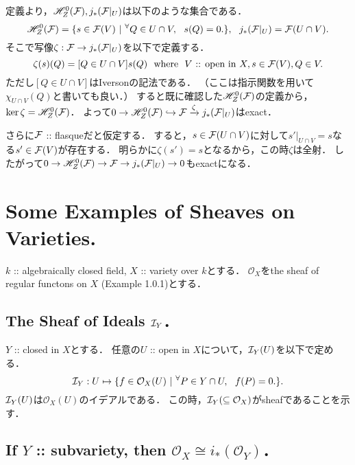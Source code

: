 \documentclass[a4paper]{jsarticle}
\begin{document}
    定義より，$\mathscr{H}_Z^0(\mathcal{F}), j_*(\mathcal{F}|_U)$は以下のような集合である．
    \[
        \mathscr{H}_Z^0(\mathcal{F})=\{ s \in \mathcal{F}(V) ~|~ {}^{\forall} Q \in U \cap V,~~ s(Q)=0. \},~~
        j_*(\mathcal{F}|_U)=\mathcal{F}(U \cap V).
    \]
    そこで写像$\zeta: \mathcal{F} \to j_*(\mathcal{F}|_U)$を以下で定義する．
    \[ \zeta(s)(Q)=[Q \in U \cap V]s(Q) ~~\text{where}~~ V \text{ :: open in } X, s \in \mathcal{F}(V), Q \in V. \]
    ただし$[Q \in U \cap V]$はIversonの記法である．
    （ここは指示関数を用いて$\chi_{U \cap V}(Q)$と書いても良い．）
    すると既に確認した$\mathscr{H}_Z^0(\mathcal{F})$の定義から，$\ker \zeta=\mathscr{H}_Z^0(\mathcal{F})$．
    よって$0 \to \mathscr{H}_Z^0(\mathcal{F}) \hookrightarrow \mathcal{F} \xrightarrow{\zeta} j_*(\mathcal{F}|_U)$はexact．
    
    さらに$\mathcal{F}$ :: flasqueだと仮定する．
    すると，$s \in \mathcal{F}(U \cap V)$に対して$s'|_{U \cap V}=s$なる$s' \in \mathcal{F}(V)$が存在する．
    明らかに$\zeta(s')=s$となるから，この時$\zeta$は全射．
    したがって$0 \to \mathscr{H}_Z^0(\mathcal{F}) \to \mathcal{F} \to j_*(\mathcal{F}|_U) \to 0$もexactになる．

\section{Some Examples of Sheaves on Varieties.} %
    $k$ :: algebraically closed field, $X$ :: variety over $k$とする．
    $\mathcal{O}_X$をthe sheaf of regular functons on $X$ (Example 1.0.1)とする．
    \subsection{The Sheaf of Ideals $\mathcal{I}_Y$．}
    $Y$ :: closed in $X$とする．
    任意の$U$ :: open in $X$について，$\mathcal{I}_Y(U)$を以下で定める．
    \[ \mathcal{I}_Y: U \mapsto \{ f \in \mathcal{O}_X(U) ~|~ {}^{\forall} P \in Y \cap U,~~ f(P)=0. \}. \]
    $\mathcal{I}_Y(U)$は$\mathcal{O}_X(U)$のイデアルである．
    この時，$\mathcal{I}_Y (\subseteq \mathcal{O}_X)$がsheafであることを示す．

    \subsection{If $Y$ :: subvariety, then $\mathcal{O}_X \cong i_*(\mathcal{O}_Y)$．}

    \subsection{ }
    \subsection{ }
\end{document}
